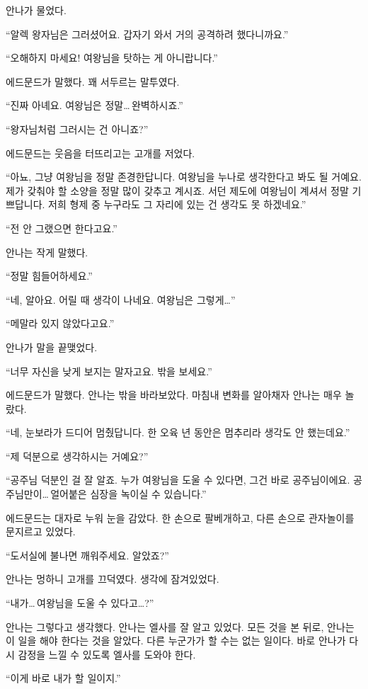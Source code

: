 안나가 물었다.

``알렉 왕자님은 그러셨어요. 갑자기 와서 거의 공격하려 했다니까요.''

``오해하지 마세요! 여왕님을 탓하는 게 아니랍니다.''

에드문드가 말했다. 꽤 서두르는 말투였다.

``진짜 아녜요. 여왕님은 정말\ldots\,완벽하시죠.''

`` 왕자님처럼 그러시는 건 아니죠?''

에드문드는 웃음을 터뜨리고는 고개를 저었다.

``아뇨, 그냥 여왕님을 정말 존경한답니다. 여왕님을 누나로 생각한다고 봐도 될 거예요. 제가 갖춰야 할 소양을 정말 많이 갖추고 계시죠. 서던 제도에 여왕님이 계셔서 정말 기쁘답니다. 저희 형제 중 누구라도 그 자리에 있는 건 생각도 못 하겠네요.''

``전 안 그랬으면 한다고요.''

안나는 작게 말했다.

``정말 힘들어하세요.''

``네, 알아요. 어릴 때 생각이 나네요. 여왕님은 그렇게\ldots''

``메말라 있지 않았다고요.''

안나가 말을 끝맺었다.

``너무 자신을 낮게 보지는 말자고요. 밖을 보세요.''

에드문드가 말했다. 안나는 밖을 바라보았다. 마침내 변화를 알아채자 안나는 매우 놀랐다.

``네, 눈보라가 드디어 멈췄답니다. 한 오육 년 동안은 멈추리라 생각도 안 했는데요.''

``제 덕분으로 생각하시는 거예요?''

``공주님 덕분인 걸 잘 알죠. 누가 여왕님을 도울 수 있다면, 그건 바로 공주님이에요. 공주님만이\ldots\,얼어붙은 심장을 녹이실 수 있습니다.''

에드문드는 대자로 누워 눈을 감았다. 한 손으로 팔베개하고, 다른 손으로 관자놀이를 문지르고 있었다.

``도서실에 불나면 깨워주세요. 알았죠?''

안나는 멍하니 고개를 끄덕였다. 생각에 잠겨있었다.

``내가\ldots\,여왕님을 도울 수 있다고\ldots?''

안나는 그렇다고 생각했다. 안나는 엘사를 잘 알고 있었다. 모든 것을 본 뒤로, 안나는 이 일을 해야 한다는 것을 알았다. 다른 누군가가 할 수는 없는 일이다. 바로 안나가 다시 감정을 느낄 수 있도록 엘사를 도와야 한다.

``이게 바로 내가 할 일이지.''



